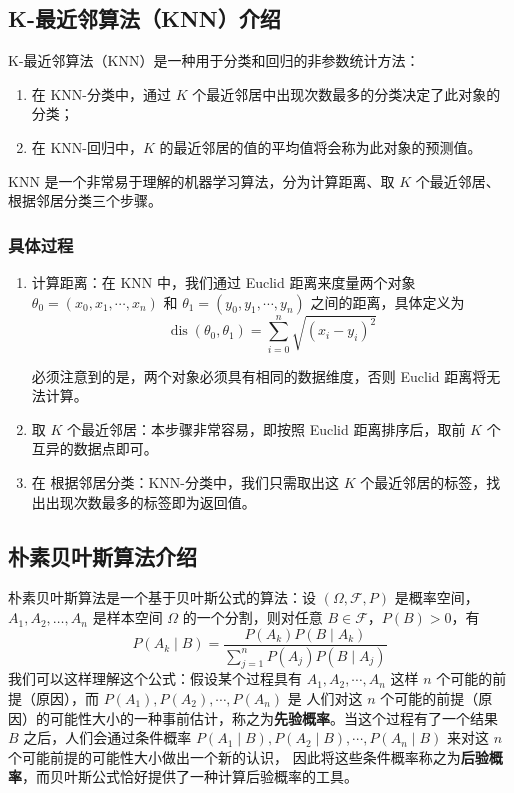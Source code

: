 \documentclass[a4paper, 11pt, cn]{elegantpaper}
\begin{document}
\subsection{K-最近邻算法（KNN）介绍}

K-最近邻算法（KNN）是一种用于分类和回归的非参数统计方法：
\begin{enumerate}
    \item 在 KNN-分类中，通过 $K$ 个最近邻居中出现次数最多的分类决定了此对象的分类；
    \item 在 KNN-回归中，$K$ 的最近邻居的值的平均值将会称为此对象的预测值。
\end{enumerate}

KNN 是一个非常易于理解的机器学习算法，分为计算距离、取 $K$ 个最近邻居、根据邻居分类三个步骤。

\subsubsection{具体过程}

\begin{enumerate}
    \item 计算距离：在 KNN 中，我们通过 Euclid 距离来度量两个对象 $\theta_0=\left(x_0, x_1, \cdots, x_n\right)$ 和 $\theta_1 = \left(y_0, y_1, \cdots, y_n\right)$
之间的距离，具体定义为
$$\operatorname{dis}(\theta_0, \theta_1) = \sum\limits_{i=0}^{n}\sqrt{\left(x_i - y_i\right)^2}$$

    必须注意到的是，两个对象必须具有相同的数据维度，否则 Euclid 距离将无法计算。
    \item 取 $K$ 个最近邻居：本步骤非常容易，即按照 Euclid 距离排序后，取前 $K$ 个互异的数据点即可。
    \item 在 根据邻居分类：KNN-分类中，我们只需取出这 $K$ 个最近邻居的标签，找出出现次数最多的标签即为返回值。
\end{enumerate}


\subsection{朴素贝叶斯算法介绍}

朴素贝叶斯算法是一个基于贝叶斯公式的算法：设 $(\Omega, \mathscr{F}, P)$ 是概率空间，$A_1, A_2, \dots, A_n$ 是样本空间 $\Omega$ 的一个分割，则对任意 $B \in \mathscr{F}$，$P(B) > 0$，有
$$P\left(A_k \mid B\right) = \dfrac{P(A_k)P(B \mid A_k)}{\sum\limits_{j = 1}^nP(A_j)P(B \mid A_j)}$$ 我们可以这样理解这个公式：假设某个过程具有 $A_1, A_2, \cdots, A_n$ 这样 $n$ 个可能的前提（原因），而 $P(A_1), P(A_2), \cdots, P(A_n)$ 是
人们对这 $n$ 个可能的前提（原因）的可能性大小的一种事前估计，称之为\textbf{先验概率}。当这个过程有了一个结果 $B$ 之后，人们会通过条件概率 $P(A_1 \mid B), P(A_2 \mid B), \cdots, P(A_n \mid B)$ 来对这 $n$ 个可能前提的可能性大小做出一个新的认识，
因此将这些条件概率称之为\textbf{后验概率}，而贝叶斯公式恰好提供了一种计算后验概率的工具。
\end{document}
